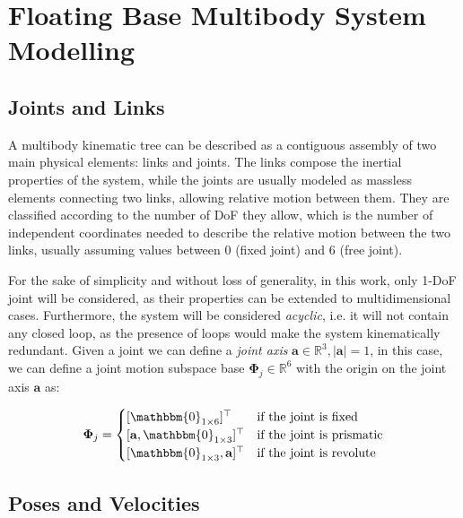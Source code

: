 \section{Floating Base Multibody System Modelling}

\subsection{Joints and Links}

A multibody kinematic tree can be described as a contiguous assembly of two main physical elements: links and joints. The links compose the inertial properties of the system, while the joints are usually modeled as massless elements connecting two links, allowing relative motion between them. They are classified according to the number of \ac{DoF} they allow, which is the number of independent coordinates needed to describe the relative motion between the two links, usually assuming values between 0 (fixed joint) and 6 (free joint).

For the sake of simplicity and without loss of generality, in this work, only 1-\ac{DoF} joint will be considered, as their properties can be extended to multidimensional cases. Furthermore, the system will be considered \textit{acyclic}, i.e. it will not contain any closed loop, as the presence of loops would make the system kinematically redundant.
Given a joint we can define a \textit{joint axis} $\mathbf{a} \in \mathbb{R}^3, |\mathbf{a}| = 1$, in this case, we can define a joint motion subspace base $\boldsymbol{\Phi} _j \in \mathbb{R} ^6$ with the origin on the joint axis $\mathbf{a}$ as:

\begin{equation}
    \label{eqn:subspace}
    \boldsymbol{\Phi} _j =
    \begin{cases}
        [\mathbbm{0}_{1 \times 6}] ^\top             & \text{if the joint is fixed}     \\
        [\mathbf{a}, \mathbbm{0}_{1 \times 3}] ^\top & \text{if the joint is prismatic} \\
        [\mathbbm{0}_{1 \times 3}, \mathbf{a}] ^\top & \text{if the joint is revolute}
    \end{cases}
\end{equation}


\subsection{Poses and Velocities}


